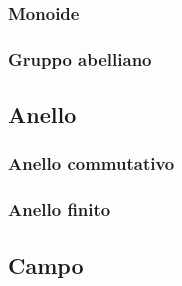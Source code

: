 \subsubsection{Monoide}

\textsf{\small }

\subsubsection{Gruppo abelliano}

\textsf{\small }

\subsection{Anello}


\textsf{\small }

\subsubsection{Anello commutativo}

\textsf{\small }

\subsubsection{Anello finito} %

\textsf{\small }

\subsection{Campo} %

